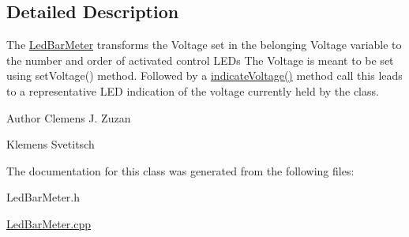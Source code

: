 \subsection{Detailed Description}
The \mbox{\hyperlink{class_led_bar_meter}{Led\+Bar\+Meter}} transforms the Voltage set in the belonging Voltage variable to the number and order of activated control L\+E\+Ds The Voltage is meant to be set using set\+Voltage() method. Followed by a \mbox{\hyperlink{class_led_bar_meter_a0c03c62888de6aee1825e1f3a67add37}{indicate\+Voltage()}} method call this leads to a representative L\+ED indication of the voltage currently held by the class. 

\begin{DoxyAuthor}{Author}
Clemens J. Zuzan 

Klemens Svetitsch 
\end{DoxyAuthor}


The documentation for this class was generated from the following files\+:\begin{DoxyCompactItemize}
\item 
Led\+Bar\+Meter.\+h\item 
\mbox{\hyperlink{_led_bar_meter_8cpp}{Led\+Bar\+Meter.\+cpp}}\end{DoxyCompactItemize}
